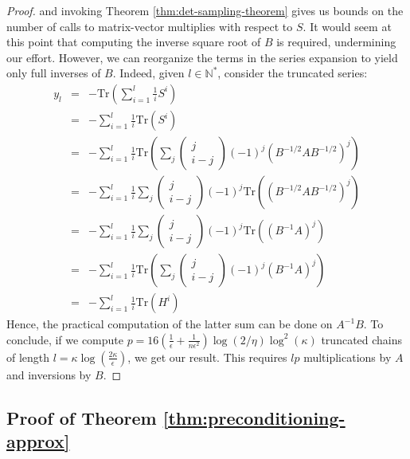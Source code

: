 \begin{proof}
and invoking Theorem \ref{thm:det-sampling-theorem} gives us bounds
on the number of calls to matrix-vector multiplies with respect to
$S$. It would seem at this point that computing the inverse square
root of $B$ is required, undermining our effort. However, we can
reorganize the terms in the series expansion to yield only full inverses
of $B$. Indeed, given $l\in\mathbb{N}^{*}$, consider the truncated
series: 
\begin{eqnarray*}
y_{l} & = & -\mbox{Tr}\left(\sum_{i=1}^{l}\frac{1}{i}S^{i}\right)\\
 & = & -\sum_{i=1}^{l}\frac{1}{i}\mbox{Tr}\left(S^{i}\right)\\
 & = & -\sum_{i=1}^{l}\frac{1}{i}\mbox{Tr}\left(\sum_{j}\left(\begin{array}{c}
j\\
i-j
\end{array}\right)\left(-1\right)^{j}\left(B^{-1/2}AB^{-1/2}\right)^{j}\right)\\
 & = & -\sum_{i=1}^{l}\frac{1}{i}\sum_{j}\left(\begin{array}{c}
j\\
i-j
\end{array}\right)\left(-1\right)^{j}\mbox{Tr}\left(\left(B^{-1/2}AB^{-1/2}\right)^{j}\right)\\
 & = & -\sum_{i=1}^{l}\frac{1}{i}\sum_{j}\left(\begin{array}{c}
j\\
i-j
\end{array}\right)\left(-1\right)^{j}\mbox{Tr}\left(\left(B^{-1}A\right)^{j}\right)\\
 & = & -\sum_{i=1}^{l}\frac{1}{i}\mbox{Tr}\left(\sum_{j}\left(\begin{array}{c}
j\\
i-j
\end{array}\right)\left(-1\right)^{j}\left(B^{-1}A\right)^{j}\right)\\
 & = & -\sum_{i=1}^{l}\frac{1}{i}\mbox{Tr}\left(H^{i}\right)
\end{eqnarray*}
Hence, the practical computation of the latter sum can be done on
$A^{-1}B$. To conclude, if we compute $p=16\left(\frac{1}{\epsilon}+\frac{1}{n\epsilon^{2}}\right)\log\left(2/\eta\right)\log^{2}\left(\kappa\right)$
truncated chains of length $l=\kappa\log\left(\frac{2\kappa}{\epsilon}\right)$,
we get our result. This requires $lp$ multiplications by $A$ and
inversions by $B$. 
\end{proof}

\subsection{Proof of Theorem \ref{thm:preconditioning-approx}}

